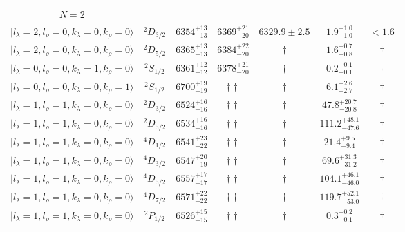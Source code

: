 \begin{tabular}{c c| c c c c c }
\hline
 $N=2$  &  &  &  &  &  \\ 
$\vert l_{\lambda}\!\!=\!2, l_{\rho}\!\!=\!0, k_{\lambda}\!\!=\!0, k_{\rho}\!\!=\!0 \rangle$ & $^{2}D_{3/2}$ & $6354^{+13}_{-13}$ & $6369^{+21}_{-20}$ & $6329.9\pm 2.5$ & $1.9^{+1.0}_{-1.0}$ & $<1.6$ \\ 
$\vert l_{\lambda}\!\!=\!2, l_{\rho}\!\!=\!0, k_{\lambda}\!\!=\!0, k_{\rho}\!\!=\!0 \rangle$ & $^{2}D_{5/2}$ & $6365^{+13}_{-13}$ & $6384^{+22}_{-20}$ & $\dagger$ & $1.6^{+0.7}_{-0.8}$ & $\dagger$ \\ 
$\vert l_{\lambda}\!\!=\!0, l_{\rho}\!\!=\!0, k_{\lambda}\!\!=\!1, k_{\rho}\!\!=\!0 \rangle$ & $^{2}S_{1/2}$ & $6361^{+12}_{-12}$ & $6378^{+21}_{-20}$ & $\dagger$ & $0.2^{+0.1}_{-0.1}$ & $\dagger$ \\ 
$\vert l_{\lambda}\!\!=\!0, l_{\rho}\!\!=\!0, k_{\lambda}\!\!=\!0, k_{\rho}\!\!=\!1 \rangle$ & $^{2}S_{1/2}$ & $6700^{+19}_{-19}$ & $\dagger\dagger$ & $\dagger$ & $6.1^{+2.6}_{-2.7}$ & $\dagger$ \\ 
$\vert l_{\lambda}\!\!=\!1, l_{\rho}\!\!=\!1, k_{\lambda}\!\!=\!0, k_{\rho}\!\!=\!0 \rangle$ & $^{2}D_{3/2}$ & $6524^{+16}_{-16}$ & $\dagger\dagger$ & $\dagger$ & $47.8^{+20.7}_{-20.8}$ & $\dagger$ \\ 
$\vert l_{\lambda}\!\!=\!1, l_{\rho}\!\!=\!1, k_{\lambda}\!\!=\!0, k_{\rho}\!\!=\!0 \rangle$ & $^{2}D_{5/2}$ & $6534^{+16}_{-16}$ & $\dagger\dagger$ & $\dagger$ & $111.2^{+48.1}_{-47.6}$ & $\dagger$ \\ 
$\vert l_{\lambda}\!\!=\!1, l_{\rho}\!\!=\!1, k_{\lambda}\!\!=\!0, k_{\rho}\!\!=\!0 \rangle$ & $^{4}D_{1/2}$ & $6541^{+23}_{-22}$ & $\dagger\dagger$ & $\dagger$ & $21.4^{+9.5}_{-9.4}$ & $\dagger$ \\ 
$\vert l_{\lambda}\!\!=\!1, l_{\rho}\!\!=\!1, k_{\lambda}\!\!=\!0, k_{\rho}\!\!=\!0 \rangle$ & $^{4}D_{3/2}$ & $6547^{+20}_{-19}$ & $\dagger\dagger$ & $\dagger$ & $69.6^{+31.3}_{-31.2}$ & $\dagger$ \\ 
$\vert l_{\lambda}\!\!=\!1, l_{\rho}\!\!=\!1, k_{\lambda}\!\!=\!0, k_{\rho}\!\!=\!0 \rangle$ & $^{4}D_{5/2}$ & $6557^{+17}_{-17}$ & $\dagger\dagger$ & $\dagger$ & $104.1^{+46.1}_{-46.0}$ & $\dagger$ \\ 
$\vert l_{\lambda}\!\!=\!1, l_{\rho}\!\!=\!1, k_{\lambda}\!\!=\!0, k_{\rho}\!\!=\!0 \rangle$ & $^{4}D_{7/2}$ & $6571^{+22}_{-22}$ & $\dagger\dagger$ & $\dagger$ & $119.7^{+52.1}_{-53.0}$ & $\dagger$ \\ 
$\vert l_{\lambda}\!\!=\!1, l_{\rho}\!\!=\!1, k_{\lambda}\!\!=\!0, k_{\rho}\!\!=\!0 \rangle$ & $^{2}P_{1/2}$ & $6526^{+15}_{-15}$ & $\dagger\dagger$ & $\dagger$ & $0.3^{+0.2}_{-0.1}$ & $\dagger$ \\ 

\end{tabular}
